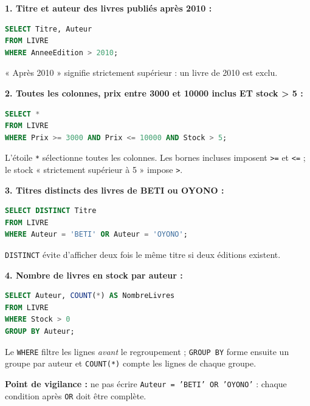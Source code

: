 \documentclass[11pt]{article}
\begin{document}
\begin{corrige}
\textbf{1. Titre et auteur des livres publiés après 2010 :}
\begin{lstlisting}[language=SQL]
SELECT Titre, Auteur
FROM LIVRE
WHERE AnneeEdition > 2010;
\end{lstlisting}
« Après 2010 » signifie strictement supérieur : un livre de 2010 est exclu.

\textbf{2. Toutes les colonnes, prix entre 3000 et 10000 inclus ET stock > 5 :}
\begin{lstlisting}[language=SQL]
SELECT *
FROM LIVRE
WHERE Prix >= 3000 AND Prix <= 10000 AND Stock > 5;
\end{lstlisting}
L'étoile \texttt{*} sélectionne toutes les colonnes. Les bornes incluses imposent \texttt{>=} et \texttt{<=} ; le stock « strictement supérieur à 5 » impose \texttt{>}.

\textbf{3. Titres distincts des livres de BETI ou OYONO :}
\begin{lstlisting}[language=SQL]
SELECT DISTINCT Titre
FROM LIVRE
WHERE Auteur = 'BETI' OR Auteur = 'OYONO';
\end{lstlisting}
\texttt{DISTINCT} évite d'afficher deux fois le même titre si deux éditions existent.

\textbf{4. Nombre de livres en stock par auteur :}
\begin{lstlisting}[language=SQL]
SELECT Auteur, COUNT(*) AS NombreLivres
FROM LIVRE
WHERE Stock > 0
GROUP BY Auteur;
\end{lstlisting}
Le \texttt{WHERE} filtre les lignes \emph{avant} le regroupement ; \texttt{GROUP BY} forme ensuite un groupe par auteur et \texttt{COUNT(*)} compte les lignes de chaque groupe.

\textbf{Point de vigilance :} ne pas écrire \texttt{Auteur = 'BETI' OR 'OYONO'} : chaque condition après \texttt{OR} doit être complète.
\end{corrige}
\end{document}
